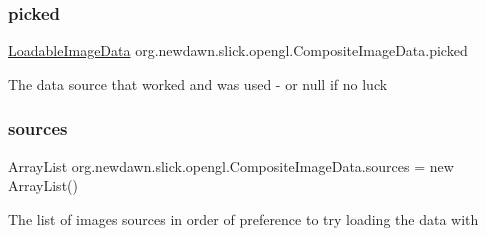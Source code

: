 \subsubsection{\texorpdfstring{picked}{picked}}
{\footnotesize\ttfamily \mbox{\hyperlink{interfaceorg_1_1newdawn_1_1slick_1_1opengl_1_1_loadable_image_data}{Loadable\+Image\+Data}} org.\+newdawn.\+slick.\+opengl.\+Composite\+Image\+Data.\+picked\hspace{0.3cm}{\ttfamily [private]}}

The data source that worked and was used -\/ or null if no luck \mbox{\label{classorg_1_1newdawn_1_1slick_1_1opengl_1_1_composite_image_data_a620f0a2292b907b7a3418d95d91e422c}} 
\subsubsection{\texorpdfstring{sources}{sources}}
{\footnotesize\ttfamily Array\+List org.\+newdawn.\+slick.\+opengl.\+Composite\+Image\+Data.\+sources = new Array\+List()\hspace{0.3cm}{\ttfamily [private]}}

The list of images sources in order of preference to try loading the data with 